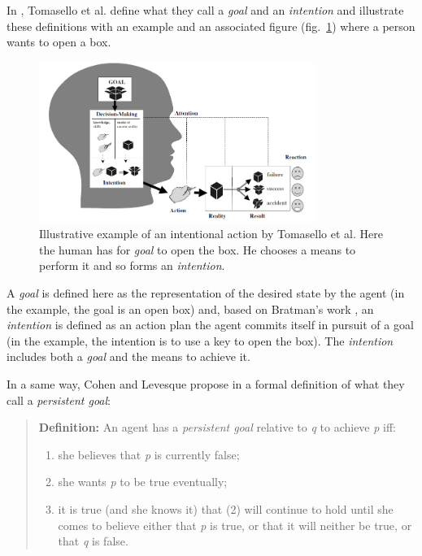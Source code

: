 \documentclass[english,a4paper,11pt,twoside]{StyleThese}
\begin{document}
In \cite{tomasello2005understanding}, Tomasello et al. define what they call a \textit{goal} and an \textit{intention} and illustrate these definitions with an example and an associated figure (fig.~\ref{fig:intention}) where a person wants to open a box.

\begin{figure}[!h]
	\centering
    \includegraphics[width=0.8\textwidth]{figs/Chapter1/intention.png}
    \caption{Illustrative example of an intentional action by Tomasello et al. Here the human has for \textit{goal} to open the box. He chooses a means to perform it and so forms an \textit{intention}.}
    \label{fig:intention}
\end{figure}

A \textit{goal} is defined here as the representation of the desired state by the agent (in the example, the goal is an open box) and, based on Bratman's work \cite{bratman1989intention}, an \textit{intention} is defined as an action plan the agent commits itself in pursuit of a goal (in the example, the intention is to use a key to open the box). The \textit{intention} includes both a \textit{goal} and the means to achieve it. 

In a same way, Cohen and Levesque propose in \cite{cohen1991teamwork} a formal definition of what they call a \textit{persistent goal}:

\begin{quote}
\textbf{Definition: } An agent has a \textit{persistent goal} relative to \textit{q} to achieve \textit{p} iff:
\begin{enumerate}
\item she believes that \textit{p} is currently false;
\item she wants \textit{p} to be true eventually;
\item it is true (and she knows it) that (2) will continue to hold until she comes to believe either that \textit{p} is true, or that it will neither be true, or that \textit{q} is false.
\end{enumerate}
\end{quote}
\end{document}
